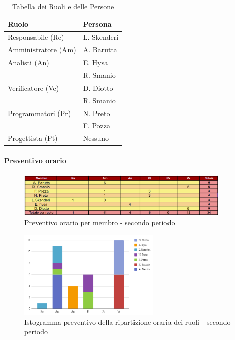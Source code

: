 \begin{table}[H]
    \centering
    \begin{tabular}{|l|l|}
    \hline
    \textbf{Ruolo} & \textbf{Persona} \\
    \hline
    \hline
    Responsabile (Re) & L. Skenderi \\
    \hline
    Amministratore (Am) & A. Barutta \\
    \hline
    Analisti (An) & E. Hysa \\
     & R. Smanio \\
     \hline
    Verificatore (Ve) & D. Diotto \\
     & R. Smanio \\
     \hline
    Programmatori (Pr) & N. Preto \\
     & F. Pozza \\
     \hline
    Progettista (Pt) & Nessuno \\
    \hline
    \end{tabular}
    \caption{Tabella dei Ruoli e delle Persone}
    \label{tab:Ruoli_persone_2}
    \end{table}
    

\paragraph{Preventivo orario} \hspace{1pt}

\begin{figure}[H]
    \centering
    \includegraphics[width=0.9\textwidth]{../Images/preventivoOrario2Periodo.png}
    \caption{Preventivo orario per membro - secondo periodo}
    \label{fig:Preventivo_orario_2}
\end{figure}

\begin{figure}[H]
    \centering
    \includegraphics[width=0.6\textwidth]{../Images/preventivoDivisioneRuoli2Periodo.png}
    \caption{Istogramma preventivo della ripartizione oraria dei ruoli - secondo periodo}
    \label{fig:Preventivo_ripartizione_oraria_2}
\end{figure}

